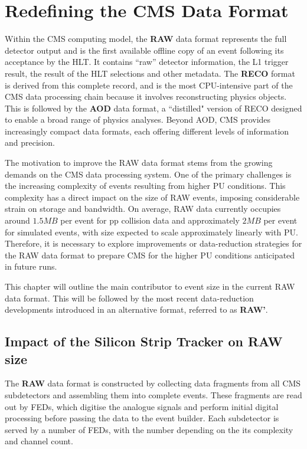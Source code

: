 \chapter{Redefining the CMS Data Format}
\thispagestyle{plain}  %
\pagestyle{chapterpages}
\label{Section:Chapter5}
\minitoc

Within the CMS computing model, the \textbf{RAW} data format represents the full detector output and is the first available offline copy of an event following its acceptance by the HLT. It contains ``raw'' detector information, the L1 trigger result, the result of the HLT selections and other metadata.  The \textbf{RECO} format is derived from this complete record, and is the most CPU-intensive part of the CMS data processing chain because it involves reconstructing physics objects. This is followed by the \textbf{AOD} data format, a ``distilled" version of RECO designed to enable a broad range of physics analyses. Beyond AOD, CMS provides increasingly compact data formats, each offering different levels of information and precision.

The motivation to improve the RAW data format stems from the growing demands on the CMS data processing system. One of the primary challenges is the increasing complexity of events resulting from higher PU conditions. This complexity has a direct impact on the size of RAW events, imposing considerable strain on storage and bandwidth.  On average, RAW data currently occupies around $1.5\unit{MB}$ per event for pp collision data and approximately $2\unit{MB}$ per event for simulated events, with size expected to scale approximately linearly with PU. Therefore, it is necessary to explore improvements or data-reduction strategies for the RAW data format to prepare CMS for the higher PU conditions anticipated in future runs. 

This chapter will outline the main contributor to event size in the current RAW data format. This will be followed by the most recent data-reduction developments introduced in an alternative format, referred to as \textbf{RAW'}.

\section{Impact of the Silicon Strip Tracker on RAW size}
The \textbf{RAW} data format is constructed by collecting data fragments from all CMS subdetectors and assembling them into complete events. These fragments are read out by FEDs, which digitise the analogue signals and perform initial digital processing before passing the data to the event builder. Each subdetector is served by a number of FEDs, with the number depending on the its complexity and channel count.

